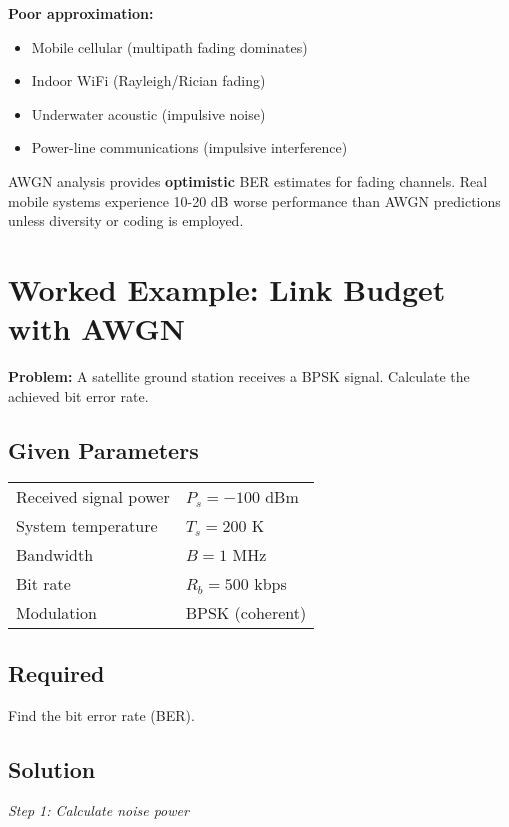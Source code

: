 \textbf{Poor approximation:}
\begin{itemize}
\item Mobile cellular (multipath fading dominates)
\item Indoor WiFi (Rayleigh/Rician fading)
\item Underwater acoustic (impulsive noise)
\item Power-line communications (impulsive interference)
\end{itemize}

\begin{warningbox}
AWGN analysis provides \textbf{optimistic} BER estimates for fading channels. Real mobile systems experience 10-20 dB worse performance than AWGN predictions unless diversity or coding is employed.
\end{warningbox}

\section{Worked Example: Link Budget with AWGN}

\textbf{Problem:} A satellite ground station receives a BPSK signal. Calculate the achieved bit error rate.

\subsection*{Given Parameters}

\begin{tabular}{@{}ll@{}}
Received signal power & $P_s = -100$ dBm \\
System temperature & $T_s = 200$ K \\
Bandwidth & $B = 1$ MHz \\
Bit rate & $R_b = 500$ kbps \\
Modulation & BPSK (coherent) \\
\end{tabular}

\subsection*{Required}
Find the bit error rate (BER).

\subsection*{Solution}

\textit{Step 1: Calculate noise power}

